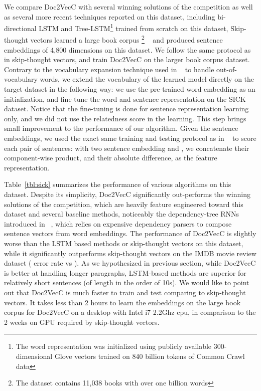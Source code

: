 \documentclass{article} \usepackage{iclr2017_conference,times}
\newcommand{\name}{Doc2VecC}
\begin{document}
We compare \name{} with several  winning solutions of the competition as well as several more recent techniques reported on this dataset, including bi-directional LSTM and Tree-LSTM\footnote{The word representation was initialized using
publicly available 300-dimensional Glove vectors trained on 840 billion tokens of Common Crawl data} trained from scratch on this dataset, Skip-thought vectors learned a large book corpus \footnote{The dataset contains 11,038 books with over one billion words} ~\citep{moviebook} and produced sentence embeddings of 4,800 dimensions on this dataset. We follow the same protocol as in skip-thought vectors, and train \name{} on the larger book corpus dataset. Contrary to the vocabulary expansion technique used in ~\citep{kiros2015skip} to handle out-of-vocabulary words, we extend the vocabulary of the learned model directly on the target dataset in the following way:  we use the pre-trained word embedding as an initialization, and fine-tune the word and sentence representation on the SICK dataset. Notice that the fine-tuning is done for sentence representation learning only, and we did not use the relatedness score in the learning.  This step brings small improvement to the performance of our algorithm. Given the sentence embeddings, we used the exact same training and testing protocol as in ~\citep{ kiros2015skip} to score each pair of sentences:  with two sentence embedding  and , we concatenate their component-wise product,  and their absolute difference,  as the feature representation. 

Table~\ref{tbl:sick} summarizes the performance of various algorithms on this dataset. Despite its simplicity, \name{} significantly out-performs the winning solutions of the competition, which are heavily feature engineered toward this dataset and several baseline methods, noticeably the dependency-tree RNNs introduced in ~\citep{socher2014grounded}, which relies on expensive dependency parsers to compose sentence vectors from word embeddings. The performance of \name{} is slightly worse than the LSTM based methods or skip-thought vectors on this dataset, while it significantly outperforms skip-thought vectors on the IMDB movie review dataset ( error rate vs ).  As we hypothesized in previous section, while \name{} is better at handling longer paragraphs, LSTM-based methods are superior for relatively short sentences (of length in the order of 10s). 
We would like to point out that \name{} is much faster to train and test comparing to skip-thought vectors. It takes less than 2 hours to learn the embeddings on the large book corpus for \name{} on a desktop with Intel i7 2.2Ghz cpu, in comparison to the 2 weeks on GPU required by skip-thought vectors. 
\end{document}
